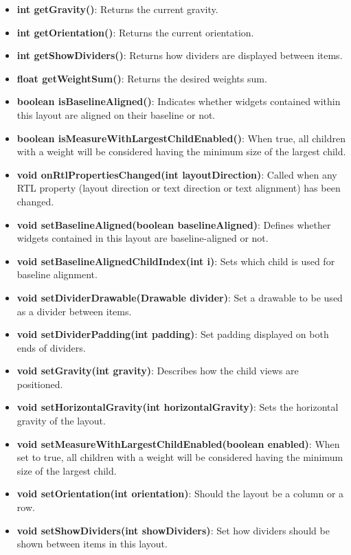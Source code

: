 \documentclass{report}
\begin{document}
\begin{itemize}
\begin{itemize}
                \item \textbf{int getGravity()}: Returns the current gravity.
                \item \textbf{int getOrientation()}: Returns the current orientation.
                \item \textbf{int getShowDividers()}: Returns how dividers are displayed between items.
                \item \textbf{float getWeightSum()}: Returns the desired weights sum.
                \item \textbf{boolean isBaselineAligned()}: Indicates whether widgets contained within this layout are aligned on their baseline or not.
                \item \textbf{boolean isMeasureWithLargestChildEnabled()}: When true, all children with a weight will be considered having the minimum size of the largest child.
                \item \textbf{void onRtlPropertiesChanged(int layoutDirection)}: Called when any RTL property (layout direction or text direction or text alignment) has been changed.
                \item \textbf{void setBaselineAligned(boolean baselineAligned)}: Defines whether widgets contained in this layout are baseline-aligned or not.
                \item \textbf{void setBaselineAlignedChildIndex(int i)}: Sets which child is used for baseline alignment.
                \item \textbf{void setDividerDrawable(Drawable divider)}: Set a drawable to be used as a divider between items.
                \item \textbf{void setDividerPadding(int padding)}: Set padding displayed on both ends of dividers.
                \item \textbf{void setGravity(int gravity)}: Describes how the child views are positioned.
                \item \textbf{void setHorizontalGravity(int horizontalGravity)}: Sets the horizontal gravity of the layout.
                \item \textbf{void setMeasureWithLargestChildEnabled(boolean enabled)}: When set to true, all children with a weight will be considered having the minimum size of the largest child.
                \item \textbf{void setOrientation(int orientation)}: Should the layout be a column or a row.
                \item \textbf{void setShowDividers(int showDividers)}: Set how dividers should be shown between items in this layout.

\end{itemize}
\end{itemize}
\end{document}
